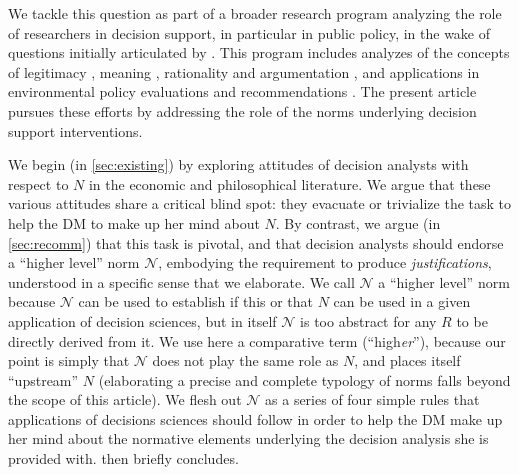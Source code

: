 \documentclass[preprint, french, english, 11pt, authoryear]{elsarticle}%
\newcommand{\ac}[1]{#1}
\newcommand{\adv}{\mathscr{N}}
\begin{document}
\begin{changebar}
We tackle this question as part of a broader research program analyzing the role of researchers in decision support, in particular in public policy, in the wake of questions initially articulated by \citet{tsoukias_policy_2013}.
This program includes analyzes of the concepts of legitimacy \citep{meinard_what_2017}, meaning \citep{meinard_utility_2018}, rationality \citep{meinard_rationality_2019} and argumentation \citep{cailloux_formal_2018}, 
and applications in environmental policy evaluations \citep{jeanmougin_mismatch_2017} and recommendations \citep{choulak_meta-decision-analysis_2019}.
The present article pursues these efforts by addressing the role of the norms underlying decision support interventions.\end{changebar}

We begin (in \cref{sec:existing}) by exploring attitudes of decision analysts with respect to $N$ in the economic and philosophical literature. 
We argue that these various attitudes share a critical blind spot: they evacuate or trivialize the task to help the \ac{DM} to make up her mind about $N$. 
By contrast, we argue (in \cref{sec:recomm}) that this task is pivotal, and that decision analysts should endorse a “higher level” norm $\adv$, embodying the requirement to produce \emph{justifications}, understood in a specific sense that we elaborate. 
We call $\adv$ a “higher level” norm because $\adv$ can be used to establish if this or that $N$ can be used in a given application of decision sciences, but in itself $\adv$ is too abstract for any $R$ to be directly derived from it.
We use here a comparative term (“high\emph{er}”), because our point is simply that $\adv$ does not play the same role as $N$, and places itself “upstream” $N$ (elaborating a precise and complete typology of norms falls beyond the scope of this article).
We flesh out $\adv$ as a series of four simple rules that applications of decisions sciences should follow in order to help the \ac{DM} make up her mind about the normative elements underlying the decision analysis she is provided with.  then briefly concludes.
\end{document}
